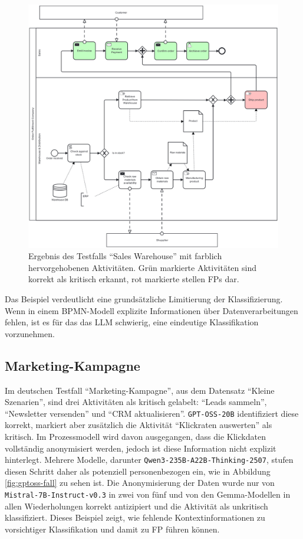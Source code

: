 \begin{figure}
    \centering
    \includegraphics[height=.41\textheight]{images/results/examples/qwen3-235B-run-3-uni-sales-warehouse}
    \caption{Ergebnis des Testfalls \enquote{Sales Warehouse} mit farblich hervorgehobenen Aktivitäten. Grün markierte Aktivitäten sind korrekt als kritisch erkannt, rot markierte stellen \acp{FP} dar.}
    \label{fig:qwen3-fall}
\end{figure}

Das Beispiel verdeutlicht eine grundsätzliche Limitierung der Klassifizierung. Wenn in einem \ac{BPMN}-Modell explizite Informationen über Datenverarbeitungen fehlen, ist es für das das \ac{LLM} schwierig, eine eindeutige Klassifikation vorzunehmen.

\subsection*{Marketing-Kampagne}

Im deutschen Testfall \enquote{Marketing-Kampagne}, aus dem Datensatz \enquote{Kleine Szenarien}, sind drei Aktivitäten als kritisch gelabelt: \enquote{Leads sammeln}, \enquote{Newsletter versenden} und \enquote{CRM aktualisieren}. \texttt{GPT-OSS-20B} identifiziert diese korrekt, markiert aber zusätzlich die Aktivität \enquote{Klickraten auswerten} als kritisch. Im Prozessmodell wird davon ausgegangen, dass die Klickdaten vollständig anonymisiert werden, jedoch ist diese Information nicht explizit hinterlegt. Mehrere Modelle, darunter \texttt{Qwen3-235B-A22B-Thinking-2507}, stufen diesen Schritt daher als potenziell personenbezogen ein, wie in Abbildung \ref{fig:gptoss-fall} zu sehen ist. Die Anonymisierung der Daten wurde nur von \texttt{Mistral-7B-Instruct-v0.3} in zwei von fünf und von den Gemma-Modellen in allen Wiederholungen korrekt antizipiert und die Aktivität als unkritisch klassifiziert. Dieses Beispiel zeigt, wie fehlende Kontextinformationen zu vorsichtiger Klassifikation und damit zu \ac{FP} führen können.

